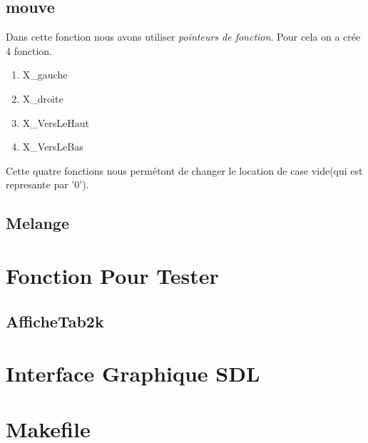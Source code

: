 \documentclass{article}
\begin{document}
\subsection{mouve}
Dans cette fonction nous avons utiliser \textit{pointeurs de fonction}. Pour cela on a crée 4 fonction.	

\begin{enumerate}
	\item X\_gauche 			
	\item X\_droite 			
	\item X\_VersLeHaut		
	\item X\_VersLeBas		
\end{enumerate}

Cette quatre fonctions nous permétont de changer le location de case vide(qui est represante par '0'). 
	

\subsection{Melange}

\section{Fonction Pour Tester}

\subsection{AfficheTab2k}



\section{Interface Graphique SDL}

\section{Makefile}
\end{document}
